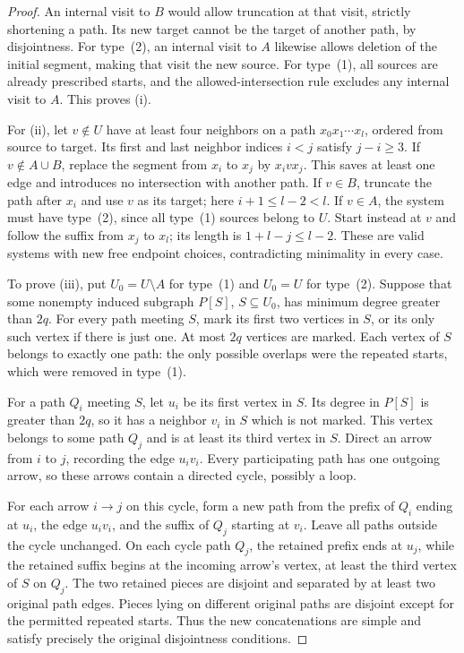 \begin{proof}
An internal visit to $B$ would allow truncation at that visit, strictly
shortening a path.  Its new target cannot be the target of another path,
by disjointness.  For type~\textup{(2)}, an internal visit to $A$ likewise
allows deletion of the initial segment, making that visit the new source.
For type~\textup{(1)}, all sources are already prescribed starts, and
the allowed-intersection rule excludes any internal visit to $A$.
This proves (i).

For (ii), let $v\notin U$ have at least four neighbors on a path
$x_0x_1\cdots x_l$, ordered from source to target.  Its first and last
neighbor indices $i<j$ satisfy $j-i\ge3$.  If $v\notin A\cup B$,
replace the segment from $x_i$ to $x_j$ by $x_i v x_j$.  This saves at
least one edge and introduces no intersection with another path.
If $v\in B$, truncate the path after $x_i$ and use $v$ as its target;
here $i+1\le l-2<l$.  If $v\in A$, the system must have type~\textup{(2)},
since all type~\textup{(1)} sources belong to $U$.  Start instead at $v$
and follow the suffix from $x_j$ to $x_l$; its length is
$1+l-j\le l-2$.  These are valid systems with new free endpoint choices,
contradicting minimality in every case.

To prove (iii), put $U_0=U\setminus A$ for type~\textup{(1)} and
$U_0=U$ for type~\textup{(2)}.  Suppose that some nonempty induced
subgraph $P[S]$, $S\subseteq U_0$, has minimum degree greater than $2q$.
For every path meeting $S$, mark its first two vertices in $S$, or its
only such vertex if there is just one.  At most $2q$ vertices are marked.
Each vertex of $S$ belongs to exactly one path: the only possible
overlaps were the repeated starts, which were removed in type~\textup{(1)}.

For a path $Q_i$ meeting $S$, let $u_i$ be its first vertex in $S$.
Its degree in $P[S]$ is greater than $2q$, so it has a neighbor $v_i$
in $S$ which is not marked.  This vertex belongs to some path $Q_j$
and is at least its third vertex in $S$.  Direct an arrow from $i$ to
$j$, recording the edge $u_i v_i$.  Every participating path has one
outgoing arrow, so these arrows contain a directed cycle, possibly a loop.

For each arrow $i\to j$ on this cycle, form a new path from the prefix
of $Q_i$ ending at $u_i$, the edge $u_i v_i$, and the suffix of $Q_j$
starting at $v_i$.  Leave all paths outside the cycle unchanged.
On each cycle path $Q_j$, the retained prefix ends at $u_j$, while the
retained suffix begins at the incoming arrow's vertex, at least the
third vertex of $S$ on $Q_j$.  The two retained pieces are disjoint and
separated by at least two original path edges.  Pieces lying on
different original paths are disjoint except for the permitted repeated
starts.  Thus the new concatenations are simple and satisfy precisely
the original disjointness conditions.


\end{proof}
